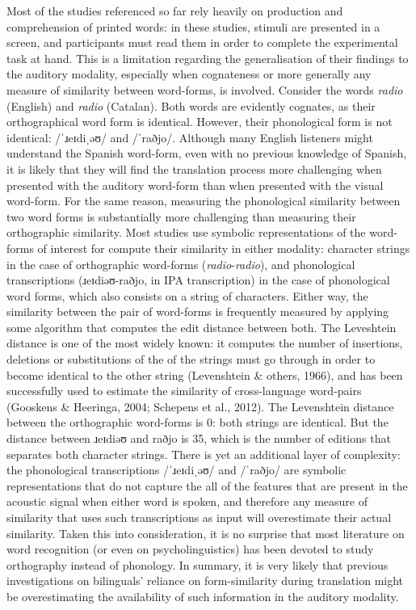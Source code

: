 \documentclass[
  english,
  man,floatsintext]{apa6}
\begin{document}
Most of the studies referenced so far rely heavily on production and comprehension of printed words: in these studies, stimuli are presented in a screen, and participants must read them in order to complete the experimental task at hand. This is a limitation regarding the generalisation of their findings to the auditory modality, especially when cognateness or more generally any measure of similarity between word-forms, is involved. Consider the words \emph{radio} (English) and \emph{radio} (Catalan). Both words are evidently cognates, as their orthographical word form is identical. However, their phonological form is not identical: /ˈɹeɪdiˌəʊ/ and /ˈraðjo/. Although many English listeners might understand the Spanish word-form, even with no previous knowledge of
Spanish, it is likely that they will find the translation process more challenging when presented with the auditory word-form than when presented with the visual word-form. For the same reason, measuring the phonological similarity between two word forms is substantially more challenging than measuring their orthographic similarity. Most studies use symbolic representations of the word-forms of interest for compute their similarity in either modality: character strings in the case of orthographic word-forms (\emph{radio}-\emph{radio}), and phonological transcriptions (ɹeɪdiəʊ-raðjo, in IPA transcription) in the case of phonological word forms, which also consists on a string of characters. Either way, the similarity between the pair of word-forms is frequently measured by applying some algorithm that computes the edit distance between both. The Leveshtein distance is one of the most widely known: it computes the number of insertions, deletions or substitutions of the of the strings must go through in order to become identical to the other string (Levenshtein \& others, 1966), and has been successfully used to estimate the similarity of cross-language word-pairs (Gooskens \& Heeringa, 2004; Schepens et al., 2012). The Levenshtein distance between the orthographic word-forms is 0: both strings are identical. But the distance between ɹeɪdiəʊ and raðjo is 35, which is the number of editions that separates both character strings. There is yet an additional layer of complexity: the phonological transcriptions /ˈɹeɪdiˌəʊ/ and /ˈraðjo/ are symbolic representations that do not capture the all of the features that are present in the acoustic signal when either word is spoken, and therefore any measure of similarity that uses such transcriptions as input will overestimate their actual similarity. Taken this into consideration, it is no surprise that most literature on word recognition (or even on psycholinguistics) has been devoted to study orthography instead of phonology. In summary, it is very likely that previous investigations on bilinguals' reliance on form-similarity during translation might be overestimating the availability of such information in the auditory modality.
\end{document}
